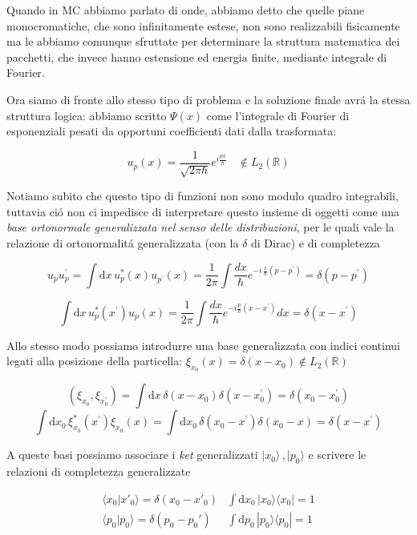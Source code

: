 Quando in MC abbiamo parlato di onde, abbiamo detto che quelle piane monocromatiche, che sono infinitamente estese, non sono realizzabili fisicamente ma le abbiamo comunque sfruttate per determinare la struttura matematica dei pacchetti, che invece hanno estensione ed energia finite, mediante integrale di Fourier.

Ora siamo di fronte allo stesso tipo di problema e la soluzione finale avr\'a la stessa struttura logica: abbiamo scritto $\Psi(x)$ come l'integrale di Fourier di esponenziali pesati da opportuni coefficienti dati dalla trasformata:

$$u_{p}(x)={\frac{1}{\sqrt{2\pi\hbar}}}e^{i{\frac{p x}{\hbar}}}\ \ \ \ \notin L_{2}(\mathbb{R})$$

Notiamo subito che questo tipo di funzioni non sono modulo quadro integrabili, tuttavia ci\'o non ci impedisce di interpretare questo insieme di oggetti come una \textit{base ortonormale generalizzata nel senso delle distribuzioni}, per le quali vale la relazione di ortonormalit\'a generalizzata (con la $\delta$ di Dirac) e di completezza

$$u_{p}u_{p}^{\prime}=\int\mathrm{d}x\,u_{p}^{*}(x)u_{p^{\prime}}(x)=\frac{1}{2\pi}\int\frac{d x}{\hbar}e^{-i\,\frac{x}{\hbar}(p-p^{\prime})}=\delta(p-p^{\prime})$$

$$\int\mathrm{d}x\,u_{p}^{*}(x^{\prime})u_{p}(x)=\frac{1}{2\pi}\int\frac{d x}{\hbar}e^{-i\frac{p}{\hbar}(x-x^{\prime})}d x=\delta(x-x^{\prime})$$

Allo stesso modo possiamo introdurre una base generalizzata con indici continui legati alla posizione della particella: $\xi_{x_0} (x) = \delta(x - x_0) \notin L_2(\mathbb{R})$

$$(\xi_{x_{0}},\xi_{x_{0}^{\prime}})=\int\mathrm{d}x\,\delta(x-x_{0})\delta(x-x_{0}^{\prime})=\delta(x_{0}-x_{0}^{\prime})$$
$$\int\mathrm{d}x_{0}\,\xi_{x_{0}}^{*}(x^{\prime})\xi_{x_{0}}(x)=\int\mathrm{d}x_{0}\,\delta(x_{0}-x^{\prime})\delta(x_{0}-x)=\delta(x-x^{\prime})$$  

A queste basi possiamo associare i \textit{ket} generalizzati $|x_{0}\rangle\,,|p_{0}\rangle$ e scrivere le relazioni di completezza generalizzate 

$$\begin{matrix}\langle x_0|x'_0\rangle=\delta(x_0-x'_0)&\int\mathrm{d}x_0\,|x_0\rangle\langle x_0|=1\\ \langle p_0|p_0\rangle=\delta(p_0-p_0')&\int\mathrm{d}p_0\,|p_0\rangle\langle p_0|=1\end{matrix}$$ 

